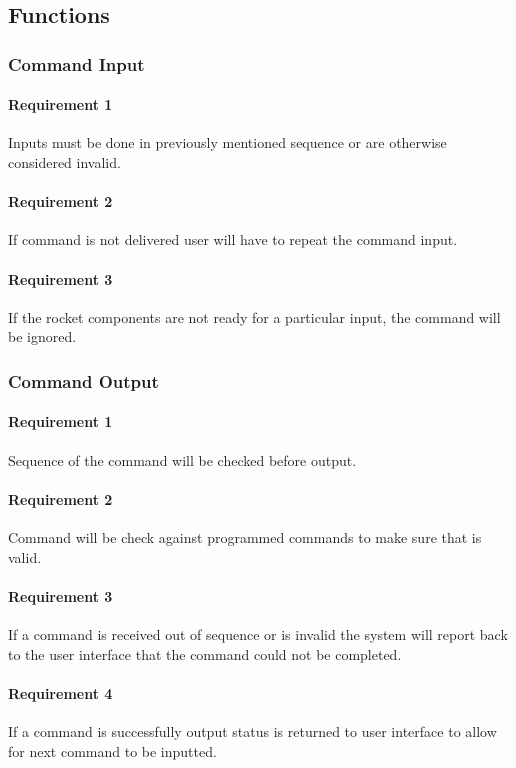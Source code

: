 \documentclass[10pt,draftclsnofoot,onecolumn,compsoc]{IEEEtran}
\begin{document}
\subsection{Functions}
\subsubsection{Command Input}
	\paragraph{ Requirement 1}Inputs must be done in previously mentioned sequence or are otherwise considered invalid. \par
	\paragraph{ Requirement 2}If command is not delivered user will have to repeat the command input.\par
	\paragraph{ Requirement 3}If the rocket components are not ready for a particular input, the command will be ignored. \par
\subsubsection{Command Output}
	\paragraph{ Requirement 1}Sequence of the command will be checked before output.\par
	\paragraph{ Requirement 2}Command will be check against programmed commands to make sure that is valid.\par
	\paragraph{ Requirement 3}If a command is received out of sequence or is invalid the system will report back to the user interface that the command could not be 	completed.\par
	\paragraph{ Requirement 4}If a command is successfully output status is returned to user interface to allow for next command to be inputted.\par
\end{document}
